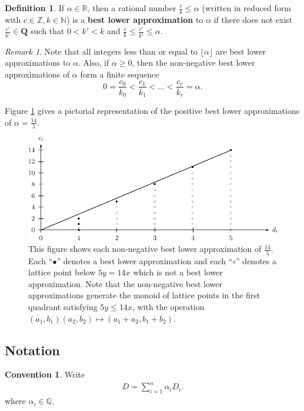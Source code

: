 \documentclass{amsart}
\theoremstyle{plain}
\theoremstyle{definition}
\newtheorem{defn}[thm]{Definition}
\newtheorem{convention}[thm]{Convention}
\theoremstyle{remark}
\newtheorem{rem}[thm]{Remark}
\numberwithin{equation}{section}
\newcommand\ssec{\subsection}
\newcommand\bn{{\mathbb N}}
\newcommand\br{{\mathbb R}}
\newcommand\bq{{\mathbb Q}}
\newcommand\bz{{\mathbb Z}}
\begin{document}
\begin{defn}
\label{defn:lower-approximation}
If $\alpha \in \br$, then a rational number $\frac{c}{k} \leq \alpha
$ (written in reduced form with $c \in \bz, k \in \bn$) is a
\textbf{best lower approximation} to $\alpha$ if there does not
exist $\frac{c'}{k'}\in \mathbf{Q}$ such that $0 < k'< k$ and
$\frac{c}{k} \le \frac{c'}{k'} \le \alpha$. 
\end{defn}

\begin{rem}
\label{rem:lower-approximation}
Note that all integers less than or equal to $\lfloor \alpha \rfloor$
are best lower approximations to $\alpha$. Also, if $\alpha \ge 0$,
then the non-negative best lower approximations of
$\alpha$ form a finite sequence
\[
	0 = \frac{c_0}{k_0} < \frac{c_1}{k_1} < \ldots < \frac{c_r}{k_r} = \alpha.
\]

\noindent
Figure \ref{fig:s14/5-lattice} gives a pictorial representation of the positive best lower approximations of $\alpha = \frac{14}{5}$.
\end{rem}

\begin{figure}
\includegraphics{pics/spin-lower-approximations-pic-pics.pdf}
\caption{This figure shows each non-negative best lower
approximation of $\frac{14}{5}.$ Each ``$\bullet$'' denotes a best
lower approximation and each ``$\circ$'' denotes a lattice point
below $5y=14x$ which is not a best lower approximation.  Note that
the non-negative best lower approximations generate the monoid of
lattice points in the first quadrant satisfying  $5y \le 14x$, with
the operation $(a_1, b_1)(a_2, b_2)\mapsto (a_1 + a_2, b_1 + b_2)$.}
\label{fig:s14/5-lattice}
\end{figure}

\ssec{Notation}
\begin{convention}
Write
\begin{align*}
	D = \sum_{i=1}^{n}\alpha_i D_i.
\end{align*}
where $\alpha_i \in \bq$.
\end{convention}
\end{document}
